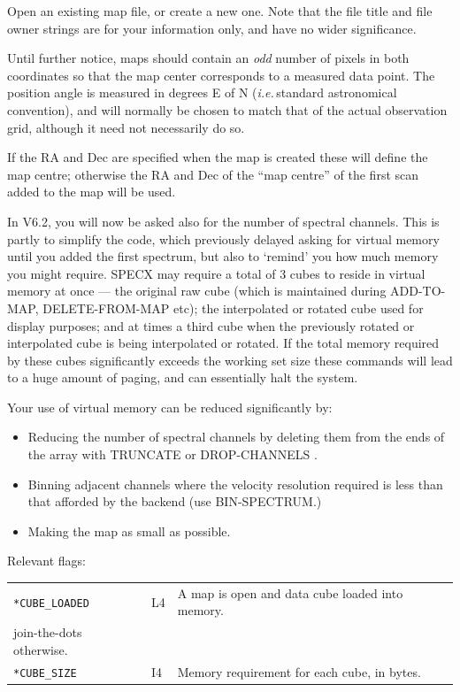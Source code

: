 \documentclass[11pt,twoside]{report}
\newcommand{\ie}{{\it i.e.\,}}
\begin{document}
Open an existing map file, or create a new one. Note that the file title
and file owner strings are for your information only, and have no
wider significance.

Until further notice, maps should contain an {\em odd} number of pixels
in both coordinates so that the map center corresponds to a measured
data point. The position angle is measured in degrees E of N (\ie standard
astronomical convention), and will normally be chosen to match that of the
actual observation grid, although it need not necessarily do so.

If the RA and Dec are specified when the map is created these will define
the map centre; otherwise the RA and Dec of the ``map centre'' of the first
scan added to the map will be used.

In V6.2, you will now be asked also for the number of spectral channels.
This is partly to simplify the code, which previously delayed asking for
virtual memory until you added the first spectrum, but also to `remind'
you how much memory you might require. SPECX may require a total of 3
cubes to reside in virtual memory at once --- the original raw cube (which
is maintained during ADD-TO-MAP, DELETE-FROM-MAP etc); the interpolated
or rotated cube used for display purposes; and at times a third cube when
the previously rotated or interpolated cube is being interpolated or rotated.
If the total memory required by these cubes significantly exceeds the
working set size these commands will lead to a huge amount of paging, and
can essentially halt the system.

Your use of virtual memory can be reduced significantly by:
\begin{itemize}
\item Reducing the number of spectral channels by deleting them from the
ends of the array with TRUNCATE or DROP-CHANNELS
.
\item Binning adjacent channels where the velocity resolution required is
less than that afforded by the backend (use BIN-SPECTRUM.)
\item Making the map as small as possible.
\end{itemize}

Relevant flags:\\
\begin{tabular}{lll}
  \verb+*CUBE_LOADED+  & L4 & A map is open and data cube loaded into memory.\\
                            join-the-dots otherwise.\\
  \verb+*CUBE_SIZE+    & I4 & Memory requirement for each cube, in bytes.\\
\end{tabular}
\end{document}
